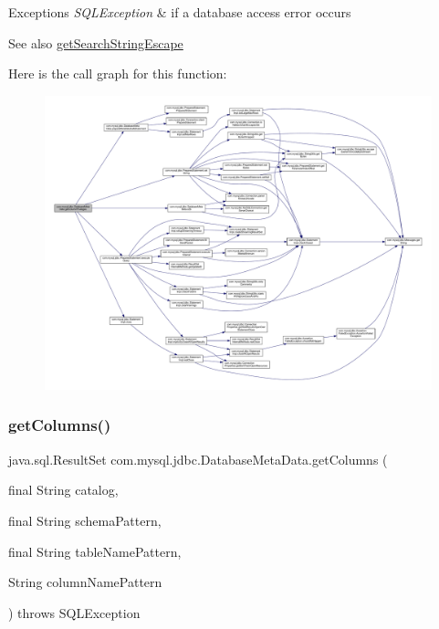 \begin{DoxyExceptions}{Exceptions}
{\em S\+Q\+L\+Exception} & if a database access error occurs \\
\hline
\end{DoxyExceptions}
\begin{DoxySeeAlso}{See also}
\mbox{\hyperlink{classcom_1_1mysql_1_1jdbc_1_1_database_meta_data_a210b7942557a965c3af550074bb6fe9d}{get\+Search\+String\+Escape}} 
\end{DoxySeeAlso}
Here is the call graph for this function\+:\nopagebreak
\begin{figure}[H]
\begin{center}
\leavevmode
\includegraphics[width=350pt]{classcom_1_1mysql_1_1jdbc_1_1_database_meta_data_aad5669e55c0db83ec88a8fd9c34a406c_cgraph}
\end{center}
\end{figure}
\mbox{\label{classcom_1_1mysql_1_1jdbc_1_1_database_meta_data_aa499f30e9c9222a702a504ad205d1802}} 
\subsubsection{\texorpdfstring{get\+Columns()}{getColumns()}}
{\footnotesize\ttfamily java.\+sql.\+Result\+Set com.\+mysql.\+jdbc.\+Database\+Meta\+Data.\+get\+Columns (\begin{DoxyParamCaption}\item[{final String}]{catalog,  }\item[{final String}]{schema\+Pattern,  }\item[{final String}]{table\+Name\+Pattern,  }\item[{String}]{column\+Name\+Pattern }\end{DoxyParamCaption}) throws S\+Q\+L\+Exception}

